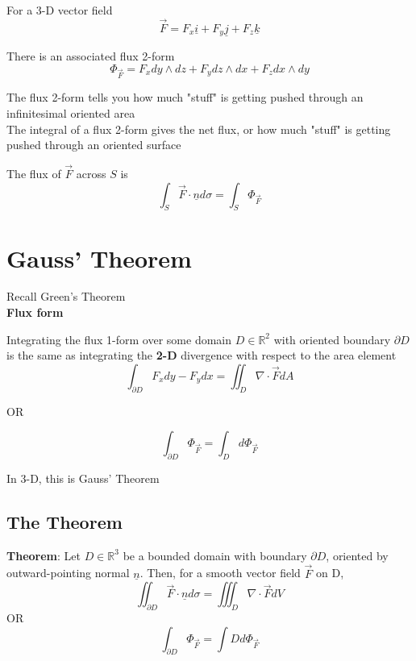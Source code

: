For a 3-D vector field
\[
  \vec{F} = F_x \underline{i} + F_y \underline{j} + F_z \underline{k}
\] 

There is an associated flux 2-form
\[
   \Phi_{\vec{F}} = F_x dy \wedge dz + F_y dz \wedge dx + F_z  dx \wedge dy
\] 

The flux 2-form tells you how much "stuff" is getting pushed through an infinitesimal oriented area  \\

The integral of a flux 2-form gives the net flux, or how much "stuff" is getting pushed through an oriented surface \\

\begin{framed}
   The flux of $\vec{F}$ across $S$ is
   \[
      \int_{S}^{} \vec{F} \cdot \underline{n} d \sigma = \int_{S}^{} \Phi_{\vec{F}} 
   \] 
\end{framed}

\section{Gauss' Theorem}

Recall Green's Theorem \\

\textbf{Flux form}

Integrating the flux 1-form over some domain $D \in \mathbb{R}^2$ with oriented boundary $\partial D$ is the same as integrating the \textbf{2-D} divergence with respect to the area element
\[
  \int_{\partial D}^{}  F_x dy - F_y dx = \iint_D \nabla \cdot \vec{F} dA 
\] 

OR

\[
   \int_{\partial D}^{} \Phi_{\vec{F}} = \int_{D}^{} d \Phi_{\vec{F}}  
\] 

In 3-D, this is Gauss' Theorem

\subsection{The Theorem}
\begin{framed}
   \textbf{Theorem}: Let $D \in \mathbb{R}^3$ be a bounded domain with boundary $\partial D$, oriented by outward-pointing normal $ \underline{n}$. Then, for a smooth vector field $\vec{F}$ on D, 
   \[
      \iint_{\partial D}^{}  \vec{F} \cdot \underline{n} d\sigma = \iiint_{D} \nabla \cdot \vec{F} dV 
   \] 
   OR
   \[
      \int_{\partial D}^{}  \Phi_{\vec{F}} = \int{D} d \Phi_{\vec{F}} 
   \] 
\end{framed}

